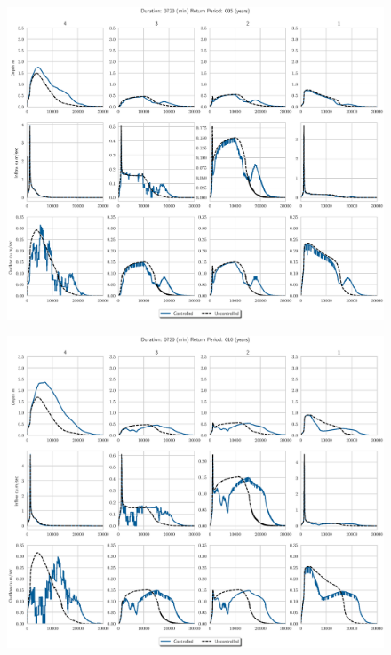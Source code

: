 \begin{figure}
    \centering
    \includegraphics[width=\linewidth]{./RL-SI-figures/77storms/0720005.eps}
\end{figure}
\begin{figure}
    \centering
    \includegraphics[width=\linewidth]{./RL-SI-figures/77storms/0720010.eps}
\end{figure}
